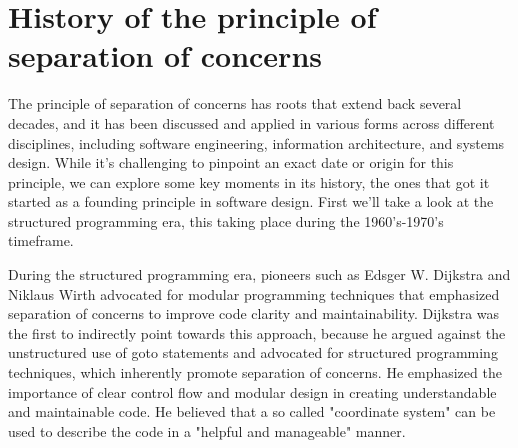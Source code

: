\section{History of the principle of separation of concerns}
The principle of separation of concerns has roots that extend back several decades, and it has been discussed and applied in various forms across different disciplines, including software engineering, information architecture, and systems design.
While it's challenging to pinpoint an exact date or origin for this principle, we can explore some key moments in its history, the ones that got it started as a founding principle in software design.
First we'll take a look at the structured programming era, this taking place during the 1960's-1970's timeframe.
\par
During the structured programming era, pioneers such as Edsger W.
Dijkstra and Niklaus Wirth advocated for modular programming techniques that emphasized separation of concerns to improve code clarity and maintainability.
Dijkstra was the first to indirectly point towards this approach, because he argued against the unstructured use of goto statements and advocated for structured programming techniques, which inherently promote separation of concerns.
He emphasized the importance of clear control flow and modular design in creating understandable and maintainable code.
He believed that a so called "coordinate system"\cite{firstDefinitionPrinciple} can be used to describe the code in a "helpful and manageable"\cite{firstDefinitionPrinciple} manner.

